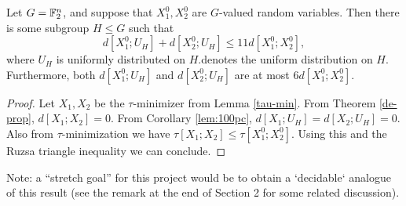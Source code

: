 \begin{theorem}\label{entropy-pfr}
  \leanok
  Let $G = \mathbb{F}_2^n$, and suppose that $X^0_1, X^0_2$ are $G$-valued random variables.
  Then there is some subgroup $H \leq G$ such that
  \[
    d[X^0_1;U_H] + d[X^0_2;U_H] \le 11 d[X^0_1;X^0_2],
  \]
  where $U_H$ is uniformly distributed on $H$.denotes the uniform distribution on $H$.
  Furthermore, both $d[X^0_1;U_H]$ and $d[X^0_2;U_H]$ are at most $6 d[X^0_1;X^0_2]$.
\end{theorem}

\begin{proof}  \leanok  Let $X_1, X_2$ be the $\tau$-minimizer from Lemma \ref{tau-min}.  From Theorem \ref{de-prop}, $d[X_1;X_2]=0$.  From Corollary \ref{lem:100pc}, $d[X_1;U_H] = d[X_2; U_H] = 0$.  Also from $\tau$-minimization we have $\tau[X_1;X_2] \leq \tau[X^0_1;X^0_2]$.  Using this and the Ruzsa triangle inequality we can conclude.
\end{proof}

Note: a ``stretch goal'' for this project would be to obtain a `decidable` analogue of this result (see the remark at the end of Section 2 for some related discussion).
